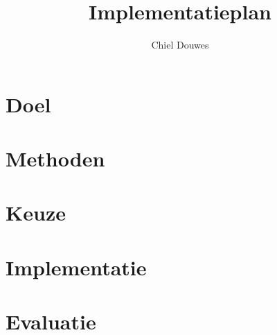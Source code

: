 \documentclass[11pt]{article}
\title{Implementatieplan}
\author{Chiel Douwes}
\begin{document}
    \maketitle


    \section{Doel}\label{sec:doel}


    \section{Methoden}\label{sec:methoden}


    \section{Keuze}\label{sec:keuze}


    \section{Implementatie}\label{sec:implementatie}


    \section{Evaluatie}\label{sec:evaluatie}
\end{document}
